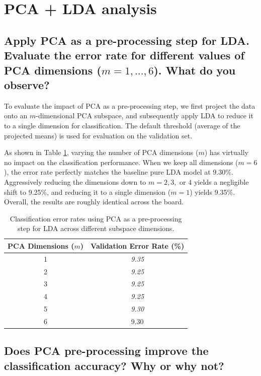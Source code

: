 
\section{PCA + LDA analysis}

\subsection*{Apply PCA as a pre-processing step for LDA. Evaluate the error rate for different values of PCA dimensions ($m=1, \dots, 6$). What do you observe?}

To evaluate the impact of PCA as a pre-processing step, we first project the data onto an $m$-dimensional PCA subspace, and subsequently apply LDA to reduce it to a single dimension for classification. The default threshold (average of the projected means) is used for evaluation on the validation set.

As shown in Table \ref{tab:pca_lda_metrics}, varying the number of PCA dimensions ($m$) has virtually no impact on the classification performance. When we keep all dimensions ($m=6$), the error rate perfectly matches the baseline pure LDA model at 9.30\%. Aggressively reducing the dimensions down to $m=2, 3,$ or $4$ yields a negligible shift to 9.25\%, and reducing it to a single dimension ($m=1$) yields 9.35\%. Overall, the results are roughly identical across the board.

\begin{table}[H]
    \centering
    \begin{tabular}{|c|c|}
        \hline
        \textbf{PCA Dimensions ($m$)} & \textbf{Validation Error Rate (\%)} \\
        \hline
        1 & \textit{9.35} \\
        2 & \textit{9.25} \\
        3 & \textit{9.25} \\
        4 & \textit{9.25} \\
        5 & \textit{9.30} \\
        6 & 9.30 \\ %
        \hline
    \end{tabular}
    \caption{Classification error rates using PCA as a pre-processing step for LDA across different subspace dimensions.}
    \label{tab:pca_lda_metrics}
\end{table}

\subsection*{Does PCA pre-processing improve the classification accuracy? Why or why not?}

